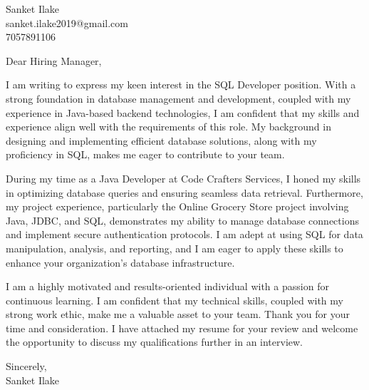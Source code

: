 \documentclass{article}
\begin{document}
\noindent Sanket Ilake \\
sanket.ilake2019@gmail.com \\
7057891106

\vspace{1em}

\noindent Dear Hiring Manager,

\vspace{0.5em}

\noindent I am writing to express my keen interest in the SQL Developer position. With a strong foundation in database management and development, coupled with my experience in Java-based backend technologies, I am confident that my skills and experience align well with the requirements of this role. My background in designing and implementing efficient database solutions, along with my proficiency in SQL, makes me eager to contribute to your team.

\vspace{0.5em}

\noindent During my time as a Java Developer at Code Crafters Services, I honed my skills in optimizing database queries and ensuring seamless data retrieval. Furthermore, my project experience, particularly the Online Grocery Store project involving Java, JDBC, and SQL, demonstrates my ability to manage database connections and implement secure authentication protocols. I am adept at using SQL for data manipulation, analysis, and reporting, and I am eager to apply these skills to enhance your organization's database infrastructure.

\vspace{0.5em}

\noindent I am a highly motivated and results-oriented individual with a passion for continuous learning. I am confident that my technical skills, coupled with my strong work ethic, make me a valuable asset to your team. Thank you for your time and consideration. I have attached my resume for your review and welcome the opportunity to discuss my qualifications further in an interview.

\vspace{0.5em}

\noindent Sincerely, \\
Sanket Ilake
\end{document}
